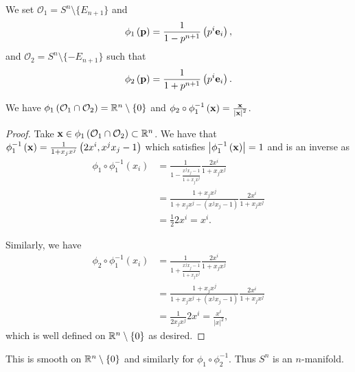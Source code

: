 \begin{examples}
\begin{enumerate}[label=\roman*)]
            We set $\mathcal{O}_1 = S^{n} \setminus \{E_{n+1}\} $ and
            \begin{align}
                \phi_1 \left( \vb{p} \right) = \frac{1}{1 - p^{n+1}} \left( p^{i} \vb{e}_{i} \right) 
            ,\end{align}
            and $\mathcal{O}_2 = S^{n} \setminus \{- E_{n+1}\} $ such that
            \begin{align}
                \phi_2 \left( \vb{p} \right) = \frac{1}{1 + p^{n+1}} \left( p^{i}\vb{e}_{i} \right) 
            .\end{align}

            We have $\phi_1 \left( \mathcal{O}_1 \cap \mathcal{O}_2 \right) = \mathbb{R}^{n} \setminus \{0\}  $ and $\phi_2 \circ \phi_1^{-1} \left( \vb{x} \right) = \frac{\vb{x}}{\left| \vb{x} \right|^2 }$. 

\begin{proof}
    Take $\vb{x} \in \phi_1 \left( \mathcal{O}_1 \cap \mathcal{O}_2 \right) \subset \mathbb{R}^{n} $. We have that $\phi_1^{-1} \left( \vb{x} \right) = \frac{1}{1 + x_{j} x^{j}} \left( 2x^{i},x^{j} x_{j} - 1\right)  $ which satisfies $\left| \phi_1^{-1} \left( \vb{x} \right)  \right| = 1$ and is an inverse as
    \begin{align}
        \phi_1 \circ \phi_1^{-1}\left( x_{i} \right) &= \frac{1}{1 - \frac{x^{j} x_{j} - 1}{1 + x_{j} x^{j}}} \frac{2x^{i}}{1 + x_{j} x^{j}} \\
        &= \frac{1 + x_{j} x^{j}}{1 + x_{j} x^{j} - \left( x^{j}x_{j} - 1 \right) } \frac{2x^{i}}{1 + x_{j} x^{j}} \\
        &= \frac{1}{2} 2x^{i} = x^{i}
    .\end{align}

    Similarly, we have
    \begin{align}
        \phi_2 \circ \phi_1^{-1} \left( x_{i} \right)  &= \frac{1}{1 + \frac{x^{j} x_{j} - 1}{1 + x_{j} x^{j}}} \frac{2x^{i}}{1 + x_{j} x^{j}} \\
        &= \frac{1 + x_{j} x^{j}}{1 + x_{j} x^{j} + \left( x^{j} x_{j} - 1 \right) }  \frac{2x^{i}}{1 + x_{j} x^{j}}\\
        &= \frac{1}{2x_{j} x^{j}} 2x^{i} = \frac{x^{i}}{\left| x \right|^2}
    ,\end{align}
    which is well defined on $\mathbb{R}^{n} \setminus \{0\} $ as desired.
\end{proof}

This is smooth on $\mathbb{R}^{n} \setminus \{0\} $ and similarly for $\phi_1 \circ \phi_2^{-1}$. Thus $S^{n}$ is an $n$-manifold.
    \end{enumerate}
\end{examples}


